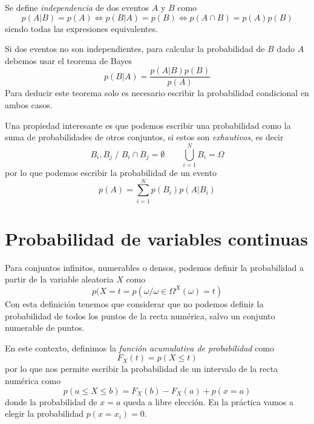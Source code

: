 \documentclass{article}
\numberwithin{equation}{section} %
\begin{document}
Se define \emph{independencia} de dos eventos $A$ y $B$ como
\begin{equation}
p(A|B) = p(A) \Leftrightarrow p(B|A) = p(B) \Leftrightarrow p(A \cap B) = p(A) p(B)
\end{equation}
siendo todas las expresiones equivalentes. 

Si dos eventos no son independientes, para calcular la probabilidad de $B$ dado $A$ debemos usar el teorema de Bayes
\begin{equation}
p(B|A) = \frac{p(A|B) p(B)}{p(A)}
\end{equation}
Para deducir este teorema solo es necesario escribir la probabilidad condicional en ambos casos.

Una propiedad interesante es que podemos escribir una probabilidad como la suma de probabilidades de otros conjuntos, si estos son \emph{exhautivos}, es decir
\begin{equation}
B_i, B_j \; / \; B_i \cap B_j = \emptyset \qquad \bigcup_{i = 1}^{N} B_i = \Omega
\end{equation}
por lo que podemos escribir la probabilidad de un evento
\begin{equation}
p(A) = \sum_{i = 1}^{N} p(B_i) p(A | B_i)
\end{equation}
\section{Probabilidad de variables continuas}
Para conjuntos infinitos, numerables o densos, podemos definir la probabilidad a partir de la variable aleatoria $X$ como
\begin{equation}
p(X = t= p(\omega / \omega \in \Omega ^ X(\omega) = t)
\end{equation}
Con esta definición tenemos que considerar que no podemos definir la probabilidad de todos los puntos de la recta numérica, salvo un conjunto numerable de puntos. 

En este contexto, definimos la \emph{función acumulativa de probabilidad} como
\begin{equation}
F_X(t) = p(X \leq t)
\end{equation}
por lo que nos permite escribir la probabilidad de un intervalo de la recta numérica como
\begin{equation}
p(a \leq X \leq b) = F_X(b) - F_X(a) + p(x = a)
\end{equation}
donde la probabilidad de $x = a$ queda a libre elección. En la práctica vamos a elegir la probabilidad $p(x=x_i) = 0$.
\end{document}
